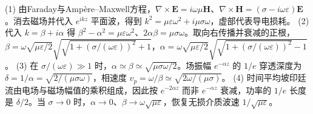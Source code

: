 (1) 由Faraday与Ampère–Maxwell方程，\(\nabla\times\mathbf E=i\omega\mu\mathbf H\)、\(\nabla\times\mathbf H=(\sigma-i\omega\varepsilon)\mathbf E\)。消去磁场并代入 \(e^{ikz}\) 平面波，得到 \(k^2=\mu\varepsilon\omega^2+i\mu\sigma\omega\)，虚部代表导电损耗。
(2) 代入 \(k=\beta+i\alpha\) 得 \(\beta^2-\alpha^2=\mu\varepsilon\omega^2\)、\(2\alpha\beta=\mu\sigma\omega\)。取向右传播并衰减的正根，\(\beta=\omega\sqrt{\mu\varepsilon/2}\sqrt{\sqrt{1+(\sigma/(\omega\varepsilon))^2}+1}\)，\(\alpha=\omega\sqrt{\mu\varepsilon/2}\sqrt{\sqrt{1+(\sigma/(\omega\varepsilon))^2}-1}\)。
(3) 在 \(\sigma/(\omega\varepsilon)\gg1\) 时，\(\alpha\simeq\beta\simeq\sqrt{\mu\sigma\omega/2}\)。场振幅 \(e^{-\alpha z}\) 的 \(1/e\) 穿透深度为 \(\delta=1/\alpha=\sqrt{2/(\mu\sigma\omega)}\)，相速度 \(v_p=\omega/\beta\simeq\sqrt{2\omega/(\mu\sigma)}\)。
(4) 时间平均坡印廷流由电场与磁场幅值的乘积组成，因此按 \(e^{-2\alpha z}\) 而非 \(e^{-\alpha z}\) 衰减，功率的 \(1/e\) 长度是 \(\delta/2\)。当 \(\sigma\to0\) 时，\(\alpha\to0\)、\(\beta\to\omega\sqrt{\mu\varepsilon}\)，恢复无损介质波速 \(1/\sqrt{\mu\varepsilon}\)。
